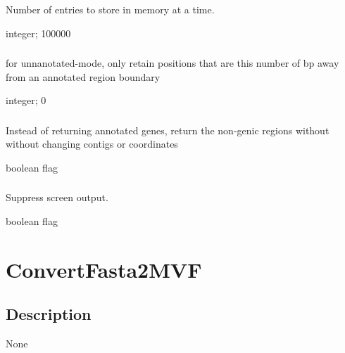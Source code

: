 \documentclass[letterpaper,11pt,english]{sphinxmanual}
\begin{document}
\subsubsection{}
\label{\detokenize{prog_desc:line-buffer-linebuffer}}
 Number of entries to store in memory at a time.

 integer;  100000


\subsubsection{}
\label{\detokenize{prog_desc:nongenic-margin-nongenicmargin}}
 for \textendash{}unnanotated-mode, only retain positions that are this number of bp away from an annotated region boundary

 integer;  0


\subsubsection{}
\label{\detokenize{prog_desc:nongenic-mode-nongenicmode}}
 Instead of returning annotated genes, return the non-genic regions without without changing contigs or coordinates

 boolean flag


\subsubsection{}
\label{\detokenize{prog_desc:quiet}}
 Suppress screen output.

 boolean flag


\section{ConvertFasta2MVF}
\label{\detokenize{prog_desc:convertfasta2mvf}}

\subsection{Description}
\label{\detokenize{prog_desc:id1}}
None
\end{document}
